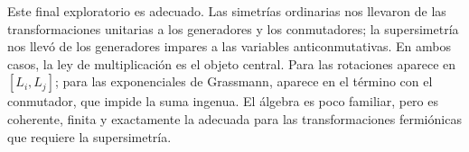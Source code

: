 \begin{classroomqa}
\end{classroomqa}

Este final exploratorio es adecuado. Las simetrías ordinarias nos llevaron de las transformaciones unitarias a los generadores y los conmutadores; la supersimetría nos llevó de los generadores impares a las variables anticonmutativas. En ambos casos, la ley de multiplicación es el objeto central. Para las rotaciones aparece en \([L_i,L_j]\); para las exponenciales de Grassmann, aparece en el término con el conmutador, que impide la suma ingenua. El álgebra es poco familiar, pero es coherente, finita y exactamente la adecuada para las transformaciones fermiónicas que requiere la supersimetría.
